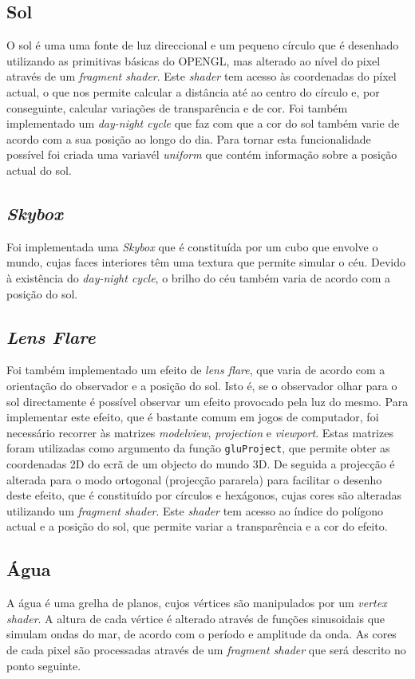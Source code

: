 \documentclass[12pt]{article}
\begin{document}
\subsection*{Sol}
O sol é uma uma fonte de luz direccional e um pequeno círculo que é desenhado utilizando as primitivas básicas do OPENGL, mas alterado ao nível do pixel através de um \textit{fragment shader}. Este \textit{shader} tem acesso às coordenadas do píxel actual, o que nos permite calcular a distância até ao centro do círculo e, por conseguinte, calcular variações de transparência e de cor. Foi também implementado um \textit{day-night cycle} que faz com que a cor do sol também varie de acordo com a sua posição ao longo do dia. Para tornar esta funcionalidade possível foi criada uma variavél \textit{uniform} que contém informação sobre a posição actual do sol.

\subsection*{\textit{Skybox}}
Foi implementada uma \textit{Skybox} que é constituída por um cubo que envolve o mundo, cujas faces interiores têm uma textura que permite simular o céu. Devido à existência do \textit{day-night cycle}, o brilho do céu também varia de acordo com a posição do sol.

\subsection*{\textit{Lens Flare}}
Foi também implementado um efeito de \textit{lens flare}, que varia de acordo com a orientação do observador e a posição do sol. Isto é, se o observador olhar para o sol directamente é possível observar um efeito provocado pela luz do mesmo. Para implementar este efeito, que é bastante comum em jogos de computador, foi necessário recorrer às matrizes \textit{modelview}, \textit{projection} e \textit{viewport}. Estas matrizes foram utilizadas como argumento da função \texttt{gluProject}, que permite obter as coordenadas 2D do ecrã de um objecto do mundo 3D. De seguida a projecção é alterada para o modo ortogonal (projecção pararela) para facilitar o desenho deste efeito, que é constituído por círculos e hexágonos, cujas cores são alteradas utilizando um \textit{fragment shader}. Este \textit{shader} tem acesso ao índice do polígono actual e a posição do sol, que permite variar a transparência e a cor do efeito.

\subsection*{Água}
A água é uma grelha de planos, cujos vértices são manipulados por um \textit{vertex shader}. A altura de cada vértice é alterado através de funções sinusoidais que simulam ondas do mar, de acordo com o período e amplitude da onda. As cores de cada pixel são processadas através de um \textit{fragment shader} que será descrito no ponto seguinte.
\end{document}
